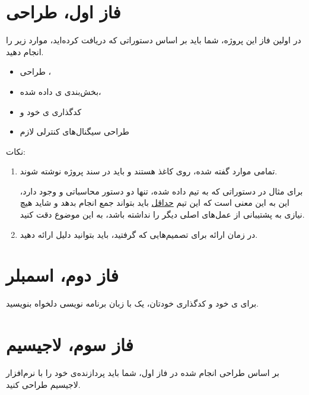 \documentclass[11pt, dvipsnames, svgnames, x11names]{article}
\begin{document}
\section{فاز اول،‌ طراحی}\label{design}
در اولین فاز این پروژه، شما باید بر اساس دستوراتی که دریافت کرده‌اید، موارد زیر را انجام دهید.
\begin{itemize}
\item 
طراحی ،
\item 
بخش‌بندی ی داده شده،
\item 
کدگذاری ی خود و
\item 
طراحی سیگنال‌های کنترلی لازم
\end{itemize}

نکات:
\begin{enumerate}
\item 
تمامی موارد گفته شده، روی کاغذ هستند و باید در سند پروژه نوشته شوند.

برای مثال در دستوراتی که به تیم 
داده شده، تنها دو دستور محاسباتی
و
وجود دارد، این به این معنی‌ است که 
این تیم \underline{حداقل} باید بتواند جمع انجام بدهد و شاید هیچ نیازی به پشتیبانی از عمل‌های اصلی دیگر را نداشته باشد، به این موضوع دقت کنید.
\item 
در زمان ارائه برای تصمیم‌هایی که گرفتید، باید بتوانید دلیل ارائه دهید.
\end{enumerate}

\section{فاز دوم، اسمبلر}
برای 
ی
خود و کدگذاری خودتان، یک 
با زبان برنامه نویسی دلخواه بنویسید.

\section{فاز سوم، لاجیسیم}
بر اساس طراحی انجام شده در فاز اول، شما باید پردازنده‌ی خود را با نرم‌افزار لاجیسیم طراحی کنید.
\end{document}
